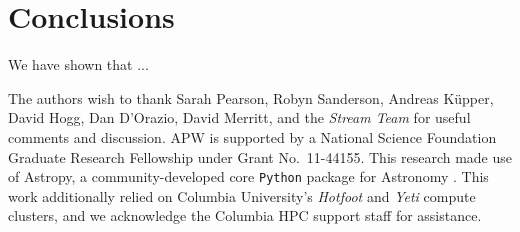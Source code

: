 \documentclass[letterpaper,12pt,preprint]{aastex}
\begin{document}
\section{Conclusions}\label{sec:conclusions}
We have shown that ...

\acknowledgements
The authors wish to thank Sarah Pearson, Robyn Sanderson, Andreas K\"upper, David Hogg, Dan D'Orazio, David Merritt, and the \emph{Stream Team} for useful comments and discussion.
APW is supported by a National Science Foundation Graduate Research Fellowship under Grant No.\ 11-44155. 
This research made use of Astropy, a community-developed core \texttt{Python} package for Astronomy \citep{astropy13}.
This work additionally relied on Columbia University's \emph{Hotfoot} and \emph{Yeti} compute clusters, and we acknowledge the Columbia HPC support staff for assistance.



\end{document}
